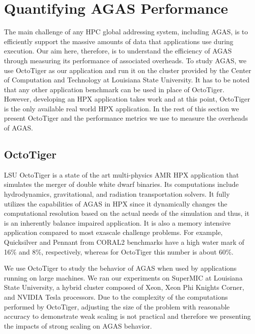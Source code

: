\section{Quantifying AGAS Performance}
\label{performance}

The main challenge of any HPC global addressing system, including AGAS, is to
efficiently support the massive amounts of data that applications use during
execution. Our aim here, therefore, is to understand the efficiency of AGAS
through measuring its performance of associated overheads.
To study AGAS, we use OctoTiger\cite{kadam2017numerical,heller2017harnessing,octotiger_repo} as our
application and run it on the cluster provided by the Center of Computation and
Technology at Louisiana State University. It has to be noted that any other
application benchmark can be used in place of OctoTiger. However, developing an
HPX application takes work and at this point, OctoTiger is the only
available real world HPX application. In the rest of this section we present
OctoTiger and the performance metrics we use to measure the overheads
of AGAS. 

\subsection{OctoTiger}
LSU OctoTiger is a state of the art multi-physics AMR HPX application that
simulates the merger of double white dwarf binaries. Its computations include
hydrodynamics, gravitational, and radiation transportation solvers. It fully
utilizes the capabilities of AGAS in HPX since it dynamically changes the
computational resolution based on the actual needs of the simulation and thus, 
it is an inherently balance impaired application. It is also a memory intensive
application compared to most exascale challenge problems. For example,
Quicksilver and Pennant from CORAL2 benchmarks have a high water mark of 16\%
and 8\%, respectively, whereas for OctoTiger this number is about 60\%.

We use OctoTiger to study the behavior of AGAS when used by applications
running on large machines. We ran our experiments on SuperMIC at Louisiana
State University, a hybrid cluster composed of Xeon, Xeon Phi Knights Corner, 
and NVIDIA Tesla processors. Due to the complexity of the computations
performed by OctoTiger, adjusting the size of the problem with reasonable
accuracy to demonstrate weak scaling is not practical and therefore we
presenting the impacts of strong scaling on AGAS behavior.

